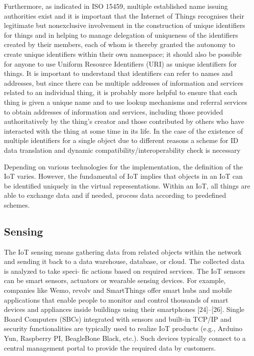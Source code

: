 Furthermore, as indicated in ISO 15459, multiple
established name issuing authorities
exist and it is important that the Internet of
Things recognises their legitimate but nonexclusive
involvement in the construction of
unique identifiers for things and in helping to
manage delegation of uniqueness of the identifiers
created by their members, each of
whom is thereby granted the autonomy to
create unique identifiers within their own
namespace; it should also be possible for
anyone to use Uniform Resource Identifiers
(URI) as unique identifiers for things.
It is important to understand that identifiers
can refer to names and addresses, but since
there can be multiple addresses of information
and services related to an individual
thing, it is probably more helpful to ensure
that each thing is given a unique name and to
use lookup mechanisms and referral services
to obtain addresses of information and services,
including those provided authoritatively
by the thing's creator and those contributed
by others who have interacted with
the thing at some time in its life. In the case
of the existence of multiple identifiers for a
single object due to different reasons a
scheme for ID data translation and dynamic
compatibility/interoperability check is necessary


Depending on various technologies for the implementation,
the definition of the IoT varies. However, the fundamental
of IoT implies that objects in an IoT can be identified
uniquely in the virtual representations. Within an IoT, all
things are able to exchange data and if needed, process data
according to predefined schemes.


\subsection{Sensing}

The IoT sensing means gathering data from related objects
within the network and sending it back to a data warehouse,
database, or cloud. The collected data is analyzed to take speci-
fic actions based on required services. The IoT sensors can be
smart sensors, actuators or wearable sensing devices. For example,
companies like Wemo, revolv and SmartThings offer smart
hubs and mobile applications that enable people to monitor
and control thousands of smart devices and appliances inside
buildings using their smartphones [24]–[26].
Single Board Computers (SBCs) integrated with sensors and
built-in TCP/IP and security functionalities are typically used
to realize IoT products (e.g., Arduino Yun, Raspberry PI, BeagleBone
Black, etc.). Such devices typically connect to a central
management portal to provide the required data by customers.


